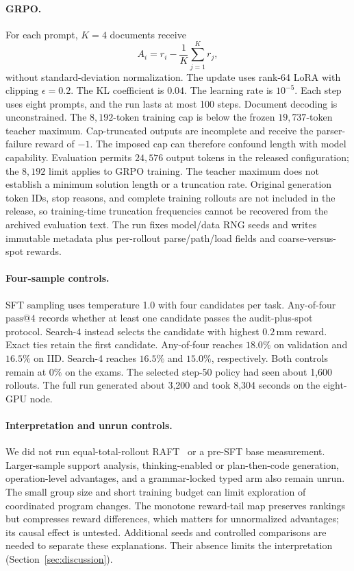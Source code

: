 \documentclass{article}
\makeatletter
\newcommand{\passat}[1]{\mathrm{pass}@#1}
\makeatother
\begin{document}
\paragraph{GRPO.}
For each prompt, $K{=}4$ documents receive
\[
A_i=r_i-\frac{1}{K}\sum_{j=1}^K r_j,
\]
without standard-deviation normalization.  The update uses rank-64
LoRA with clipping $\epsilon=0.2$.  The KL coefficient is $0.04$.
The learning rate is $10^{-5}$.  Each step uses eight prompts, and the
run lasts at most 100 steps.  Document decoding is unconstrained.
The $8{,}192$-token training cap is below the frozen $19{,}737$-token
teacher maximum.  Cap-truncated outputs are incomplete and receive the
parser-failure reward of $-1$.  The imposed cap can therefore confound
length with model capability. Evaluation permits $24{,}576$ output
tokens in the released configuration; the $8{,}192$ limit applies to
GRPO training. The teacher maximum does not establish a minimum
solution length or a truncation rate. Original generation token IDs,
stop reasons, and complete training rollouts are not included in the
release, so training-time truncation frequencies cannot be recovered
from the archived evaluation text. The run fixes
model/data RNG seeds and writes immutable metadata plus per-rollout
parse/path/load fields and coarse-versus-spot rewards.

\paragraph{Four-sample controls.}
SFT sampling uses temperature 1.0 with four candidates per task.
Any-of-four $\passat{4}$ records whether at least one candidate passes
the audit-plus-spot protocol.  Search-4 instead selects the candidate
with highest $0.2$\,mm reward.  Exact ties retain the first candidate.
Any-of-four reaches $18.0\%$ on validation and $16.5\%$ on IID.
Search-4 reaches $16.5\%$ and $15.0\%$, respectively.  Both controls
remain at $0\%$ on the exams.
The selected step-50 policy had seen about 1,600 rollouts.  The full
run generated about 3,200 and took 8,304 seconds on the eight-GPU node.

\paragraph{Interpretation and unrun controls.}
We did not run equal-total-rollout RAFT~\citep{dong2023raft} or a
pre-SFT base measurement. Larger-sample support analysis, thinking-enabled
or plan-then-code generation, operation-level advantages, and a
grammar-locked typed arm also remain unrun. The small group size and
short training budget can limit exploration of coordinated program
changes. The monotone reward-tail map preserves rankings but compresses
reward differences, which matters for unnormalized advantages; its
causal effect is untested. Additional seeds and controlled comparisons
are needed to separate these explanations. Their absence limits the
interpretation (Section~\ref{sec:discussion}).
\end{document}

